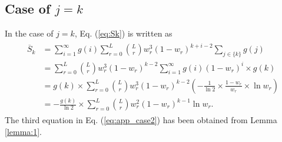 \subsection{Case of $j=k$}
In the case of $j=k$, Eq. (\ref{eq:Sk}) is written as
\begin{align}\begin{split}\label{eq:app_case2}
  \overline{S}_{k} 
  &= \sum_{i=1}^{\infty} g(i) \sum_{r=0}^{L} \binom{L}{r} w_r^3 (1-w_r)^{k+i-2} \sum_{j \in \{k\}} g(j)\\
  &= \sum_{r=0}^{L} \binom{L}{r} w_r^3 (1-w_r)^{k-2} \sum_{i=1}^{\infty} g(i) (1-w_r)^{i} \times g(k) \\
  &= g(k) \times \sum_{r=0}^{L} \binom{L}{r} w_r^3 (1-w_r)^{k-2} \left( -\frac{1}{\ln 2} \times \frac{1-w_{r}}{w_{r}} \times \ln w_{r} \right) \\
  &= -\frac{g(k)}{\ln 2} \times \sum_{r=0}^{L} \binom{L}{r} w_r^2 (1-w_r)^{k-1} \ln w_{r}.
\end{split}\end{align}
The third equation in Eq. (\ref{eq:app_case2}) has been obtained from Lemma \ref{lemma:1}.
